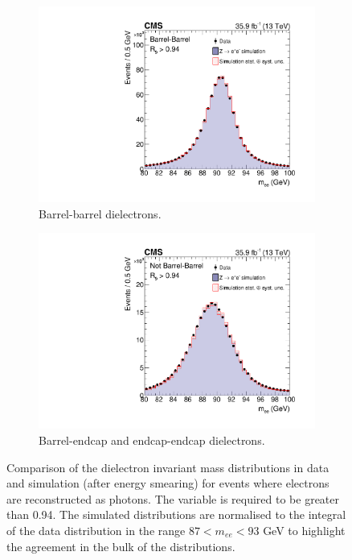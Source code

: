 \begin{figure}[h!]
  \centering
  \begin{subfigure}{0.49\textwidth}
    \includegraphics[width=\textwidth]{Figures/Objects/meeBarrel_2016}
    \caption{Barrel-barrel dielectrons.}
    \label{fig:obj_meeBarrel_2016}
  \end{subfigure}
  \begin{subfigure}{0.49\textwidth}
    \includegraphics[width=\textwidth]{Figures/Objects/meeEndcap_2016}
    \caption{Barrel-endcap and endcap-endcap dielectrons.}
    \label{fig:obj_meeEndcap_2016}
  \end{subfigure}
  \caption{Comparison of the dielectron invariant mass distributions in data and simulation
  (after energy smearing) for \Zee
  events where electrons are reconstructed as photons.
  The \RNINE variable is required to be greater than 0.94.
  The simulated distributions are
  normalised to the integral of the data distribution in the range $87 < m_{ee} < 93$ GeV to highlight
  the agreement in the bulk of the distributions.}
  \label{fig:obj_mee_2016}
\end{figure}

